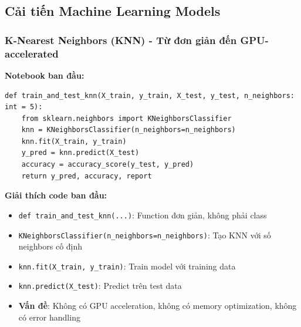 \subsection{Cải tiến Machine Learning Models}

\subsubsection{K-Nearest Neighbors (KNN) - Từ đơn giản đến GPU-accelerated}

\textbf{Notebook ban đầu:}
\begin{verbatim}
def train_and_test_knn(X_train, y_train, X_test, y_test, n_neighbors: int = 5):
    from sklearn.neighbors import KNeighborsClassifier
    knn = KNeighborsClassifier(n_neighbors=n_neighbors)
    knn.fit(X_train, y_train)
    y_pred = knn.predict(X_test)
    accuracy = accuracy_score(y_test, y_pred)
    return y_pred, accuracy, report
\end{verbatim}

\textbf{Giải thích code ban đầu:}
\begin{itemize}
    \item \texttt{def train\_and\_test\_knn(...)}: Function đơn giản, không phải class
    \item \texttt{KNeighborsClassifier(n\_neighbors=n\_neighbors)}: Tạo KNN với số neighbors cố định
    \item \texttt{knn.fit(X\_train, y\_train)}: Train model với training data
    \item \texttt{knn.predict(X\_test)}: Predict trên test data
    \item \textbf{Vấn đề}: Không có GPU acceleration, không có memory optimization, không có error handling
\end{itemize}

